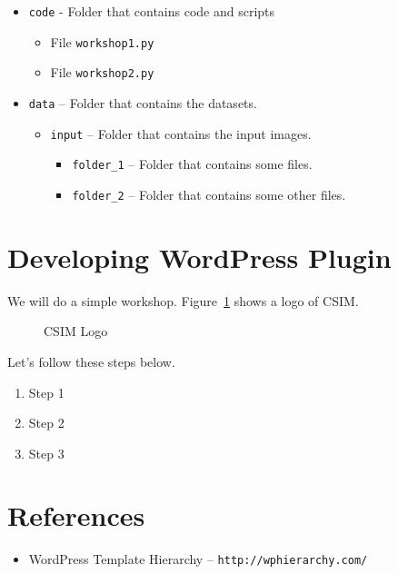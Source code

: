 \documentclass{article}
\begin{document}
\begin{itemize}
    \item[-] {\tt code} - Folder that contains code and scripts
    \begin{itemize}
        \item[-] File {\tt workshop1.py}
        \item[-] File {\tt workshop2.py}
    \end{itemize}
    \item[-] {\tt data} -- Folder that contains the datasets.
    \begin{itemize}
        \item[-] {\tt input} -- Folder that contains the input images.
        \begin{itemize}
            \item[-] {\tt folder\_1} -- Folder that contains some files.
            \item[-] {\tt folder\_2} -- Folder that contains some other files.
        \end{itemize}
    \end{itemize}
\end{itemize}

\FloatBarrier

\section*{Developing WordPress Plugin}

\noindent We will do a simple workshop. Figure~\ref{fig:csim-logo} shows
a logo of CSIM. \\

\begin{figure}[t]
    \centering
    \caption{CSIM Logo}
    \label{fig:csim-logo}
\end{figure}

\noindent Let's follow these steps below.

\begin{enumerate}
    \item Step 1
    \item Step 2
    \item Step 3
\end{enumerate}

\section*{References}

\begin{itemize}
    \item[1] WordPress Template Hierarchy -- \tt{http://wphierarchy.com/}
\end{itemize}
\end{document}
